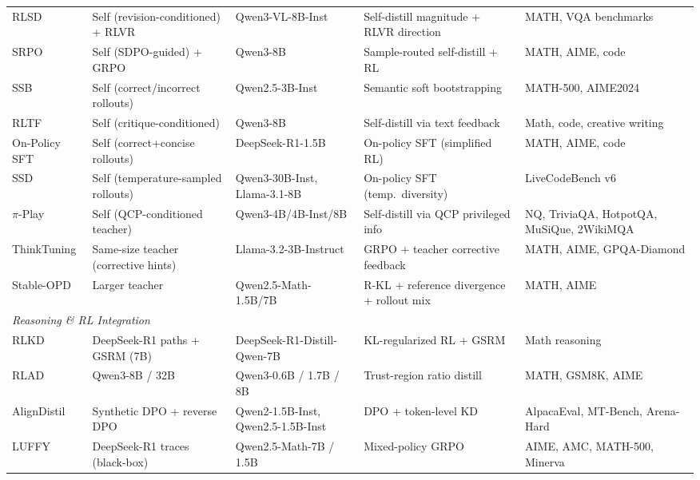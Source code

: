 \documentclass{article} %
\begin{document}
\begin{table}[t]
{\begin{tabular}{@{}lllll@{}}
        RLSD \citep{yang2026selfdistilled} & Self (revision-conditioned) + RLVR & Qwen3-VL-8B-Inst & Self-distill magnitude + RLVR direction & MATH, VQA benchmarks \\
        SRPO \citep{li2026unifying} & Self (SDPO-guided) + GRPO & Qwen3-8B & Sample-routed self-distill + RL & MATH, AIME, code \\
        SSB \citep{mitra2025semantic} & Self (correct/incorrect rollouts) & Qwen2.5-3B-Inst & Semantic soft bootstrapping & MATH-500, AIME2024 \\
        RLTF \citep{song2026expanding} & Self (critique-conditioned) & Qwen3-8B & Self-distill via text feedback & Math, code, creative writing \\
        On-Policy SFT \citep{zhao2026onpolicy} & Self (correct+concise rollouts) & DeepSeek-R1-1.5B & On-policy SFT (simplified RL) & MATH, AIME, code \\
        SSD \citep{zhang2026embarrassingly} & Self (temperature-sampled rollouts) & Qwen3-30B-Inst, Llama-3.1-8B & On-policy SFT (temp.~diversity) & LiveCodeBench v6 \\
        $\pi$-Play \citep{zhang2026piplay} & Self (QCP-conditioned teacher) & Qwen3-4B/4B-Inst/8B & Self-distill via QCP privileged info & NQ, TriviaQA, HotpotQA, MuSiQue, 2WikiMQA \\
        ThinkTuning \citep{rrv2025thinktuning} & Same-size teacher (corrective hints) & Llama-3.2-3B-Instruct & GRPO + teacher corrective feedback & MATH, AIME, GPQA-Diamond \\
        Stable-OPD \citep{luo2026demystifying} & Larger teacher & Qwen2.5-Math-1.5B/7B & R-KL + reference divergence + rollout mix & MATH, AIME \\
        \midrule
        \multicolumn{5}{l}{\textit{Reasoning \& RL Integration}} \\
        \midrule
        RLKD \citep{2505.16142} & DeepSeek-R1 paths + GSRM (7B) & DeepSeek-R1-Distill-Qwen-7B & KL-regularized RL + GSRM & Math reasoning \\
        RLAD \citep{2602.22495} & Qwen3-8B / 32B & Qwen3-0.6B / 1.7B / 8B & Trust-region ratio distill & MATH, GSM8K, AIME \\
        AlignDistil \citep{2503.02832} & Synthetic DPO + reverse DPO & Qwen2-1.5B-Inst, Qwen2.5-1.5B-Inst & DPO + token-level KD & AlpacaEval, MT-Bench, Arena-Hard \\
        LUFFY \citep{2504.14945} & DeepSeek-R1 traces (black-box) & Qwen2.5-Math-7B / 1.5B & Mixed-policy GRPO & AIME, AMC, MATH-500, Minerva \\

\end{tabular}}
\end{table}
\end{document}
